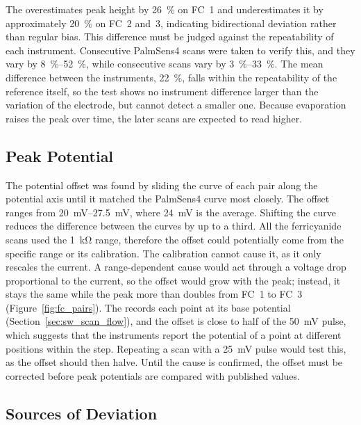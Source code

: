  
The \devname{} overestimates peak height by \SI{26}{\percent} on FC~1 and underestimates it by approximately \SI{20}{\percent} on FC~2 and~3, indicating bidirectional deviation rather than regular bias. This difference must be judged against the repeatability of each instrument. Consecutive PalmSens4 scans were taken to verify this, and they vary by \SIrange{8}{52}{\percent}, while consecutive \devname{} scans vary by \SIrange{3}{33}{\percent}. The mean difference between the instruments, \SI{22}{\percent}, falls within the repeatability of the reference itself, so the test shows no instrument difference larger than the variation of the electrode, but cannot detect a smaller one. Because evaporation raises the peak over time, the later scans are expected to read higher.
 
\subsection{Peak Potential}
\label{sec:fc_shift}
 
The potential offset was found by sliding the \devname{} curve of each pair
along the potential axis until it matched the
PalmSens4 curve most closely. The offset ranges from \SIrange{20}{27.5}{\milli\volt}, where \SI{24}{\milli\volt} is the average. Shifting the \devname{} curve reduces the difference between the curves by up to a third. All the \devname{} ferricyanide scans used the \SI{1}{\kilo\ohm} range, therefore the offset
could potentially come from the specific range or its calibration. The calibration
cannot cause it, as it only rescales the current. A range-dependent cause would act through a voltage drop proportional to the
current, so the offset would grow with the peak; instead, it stays the same
while the peak more than doubles from FC~1 to FC~3
(Figure~\ref{fig:fc_pairs}). The \devname{} records each point at its base potential (Section~\ref{sec:sw_scan_flow}), and the offset is close to half of the \SI{50}{\milli\volt} pulse, which suggests that the instruments report the potential of a point at different positions within the step. Repeating a scan with a \SI{25}{\milli\volt} pulse would test this, as the offset should then halve. Until the cause is confirmed, the offset must be corrected before peak potentials are compared with published values.
 
 
\subsection{Sources of Deviation}
\label{sec:fc_deviation}
 
